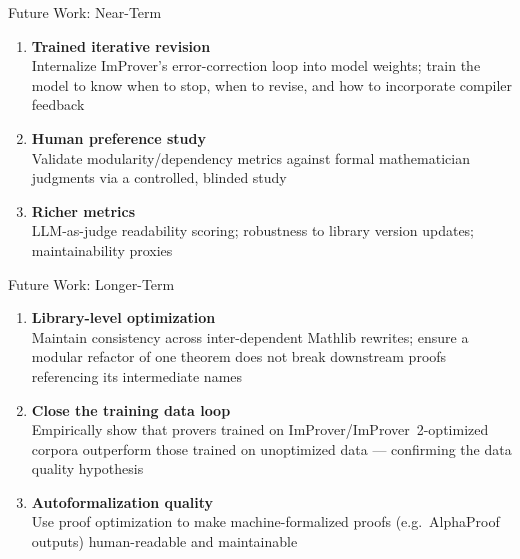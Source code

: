 \documentclass{beamer}
\begin{document}
\begin{frame}{Future Work: Near-Term}
\vspace{0.8em}
\begin{enumerate}\setlength{\itemsep}{12pt}
  \item \textbf{Trained iterative revision}\\
    \small Internalize ImProver's error-correction loop into model weights; train the model to know when to stop, when to revise, and how to incorporate compiler feedback
  \item \textbf{Human preference study}\\
    \small Validate modularity/dependency metrics against formal mathematician judgments via a controlled, blinded study
  \item \textbf{Richer metrics}\\
    \small LLM-as-judge readability scoring; robustness to library version updates; maintainability proxies
\end{enumerate}
\end{frame}

\begin{frame}{Future Work: Longer-Term}
\vspace{0.8em}
\begin{enumerate}\setlength{\itemsep}{12pt}
  \item \textbf{Library-level optimization}\\
    \small Maintain consistency across inter-dependent Mathlib rewrites; ensure a modular refactor of one theorem does not break downstream proofs referencing its intermediate names
  \item \textbf{Close the training data loop}\\
    \small Empirically show that provers trained on ImProver/ImProver~2-optimized corpora outperform those trained on unoptimized data --- confirming the data quality hypothesis
  \item \textbf{Autoformalization quality}\\
    \small Use proof optimization to make machine-formalized proofs (e.g.\ AlphaProof outputs) human-readable and maintainable
\end{enumerate}
\end{frame}
\end{document}
